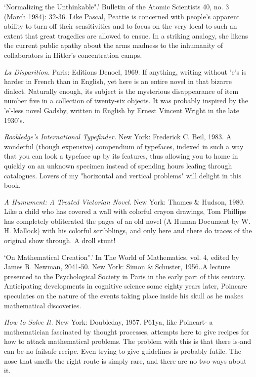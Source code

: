  `Normalizing the Unthinkable".' Bulletin of the Atomic Scientists 40, no. 3 (March 1984): 32-36. Like Pascal, Peattie is concerned with people's apparent ability to turn off their sensitivities and to focus on the very local to such an extent that great tragedies are allowed to ensue. In a striking analogy, she likens the current public apathy about the arms madness to the inhumanity of collaborators in Hitler's concentration camps.

 {\sl La Disparition.} Paris: Editions Denoel, 1969. If anything, writing without 'e's is harder in French than in English, yet here is an entire novel in that bizarre dialect. Naturally enough, its subject is the mysterious disappearance of item number five in a collection of twenty-six objects. It was probably inspired by the 'e'-less novel Gadsby, written in English by Ernest Vincent Wright in the late 1930's.

 {\sl Rookledge's International Typefinder.} New York: Frederick C. Beil, 1983. A wonderful (though expensive) compendium of typefaces, indexed in such a way that you can look a typeface up by its features, thus allowing you to home in quickly on an unknown specimen instead of spending hours leafing through catalogues. Lovers of my "horizontal and vertical problems" will delight in this book.

 {\sl A Humument: A Treated Victorian Novel.} New York: Thames \& Hudson, 1980. Like a child who has covered a wall with colorful crayon drawings, Tom Phillips has completely obliterated the pages of an old novel (A Human Document by W. H. Mallock) with his colorful scribblings, and only here and there do traces of the original show through. A droll stunt!

 `On Mathematical Creation".' In The World of Mathematics, vol. 4, edited by James R. Newman, 2041-50. New York: Simon \& Schuster, 1956..A lecture presented to the Psychological Society in Paris in the early part of this century. Anticipating developments in cognitive science some eighty years later, Poincare speculates on the nature of the events taking place inside his skull as he makes mathematical discoveries.

 {\sl How to Solve It.} New York: Doubleday, 1957. P61ya, like Poincart- a mathematician fascinated by thought processes, attempts here to give recipes for how to attack mathematical problems. The problem with this is that there is-and can be-no failsafe recipe. Even trying to give guidelines is probably futile. The nose that smells the right route is simply rare, and there are no two ways about it.

